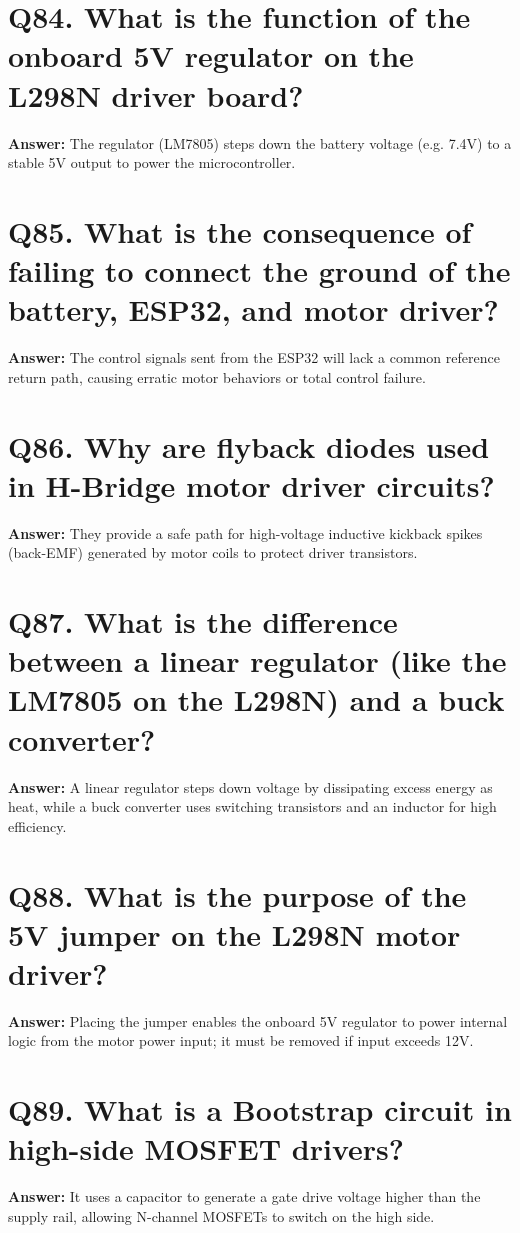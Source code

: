 \documentclass[12pt,a4paper,oneside]{report}
\begin{document}
\section{Q84. What is the function of the onboard 5V regulator on the L298N driver board?}
\textbf{Answer:} The regulator (LM7805) steps down the battery voltage (e.g. 7.4V) to a stable 5V output to power the microcontroller.

\section{Q85. What is the consequence of failing to connect the ground of the battery, ESP32, and motor driver?}
\textbf{Answer:} The control signals sent from the ESP32 will lack a common reference return path, causing erratic motor behaviors or total control failure.

\section{Q86. Why are flyback diodes used in H-Bridge motor driver circuits?}
\textbf{Answer:} They provide a safe path for high-voltage inductive kickback spikes (back-EMF) generated by motor coils to protect driver transistors.

\section{Q87. What is the difference between a linear regulator (like the LM7805 on the L298N) and a buck converter?}
\textbf{Answer:} A linear regulator steps down voltage by dissipating excess energy as heat, while a buck converter uses switching transistors and an inductor for high efficiency.

\section{Q88. What is the purpose of the 5V jumper on the L298N motor driver?}
\textbf{Answer:} Placing the jumper enables the onboard 5V regulator to power internal logic from the motor power input; it must be removed if input exceeds 12V.

\section{Q89. What is a Bootstrap circuit in high-side MOSFET drivers?}
\textbf{Answer:} It uses a capacitor to generate a gate drive voltage higher than the supply rail, allowing N-channel MOSFETs to switch on the high side.
\end{document}
